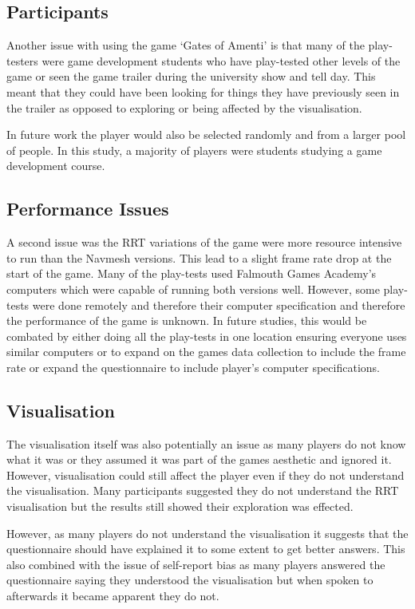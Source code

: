 \documentclass[journal]{IEEEtran}
\begin{document}
	\subsection{Participants}
	Another issue with using the game `Gates of Amenti' is that many of the play-testers were game development students who have play-tested other levels of the game or seen the game trailer during the university show and tell day. This meant that they could have been looking for things they have previously seen in the trailer as opposed to exploring or being affected by the visualisation.
	
	In future work the player would also be selected randomly and from a larger pool of people. In this study, a majority of players were students studying a game development course.
	
	\subsection{Performance Issues}
	A second issue was the RRT variations of the game were more resource intensive to run than the Navmesh versions. This lead to a slight frame rate drop at the start of the game. 
	Many of the play-tests used Falmouth Games Academy's computers which were capable of running both versions well. However, some play-tests were done remotely and therefore their computer specification and therefore the performance of the game is unknown. In future studies, this would be combated by either doing all the play-tests in one location ensuring everyone uses similar computers or to expand on the games data collection to include the frame rate or expand the questionnaire to include player's computer specifications.     
	
	\subsection{Visualisation}    
	The visualisation itself was also potentially an issue as many players do not know what it was or they assumed it was part of the games aesthetic and ignored it. However, visualisation could still affect the player even if they do not understand the visualisation.  Many participants suggested they do not understand the RRT visualisation but the results still showed their exploration was effected. 
	
	However, as many players do not understand the visualisation it suggests that the questionnaire should have explained it to some extent to get better answers. This also combined with the issue of self-report bias as many players answered the questionnaire saying they understood the visualisation but when spoken to afterwards it became apparent they do not. 
	
\end{document}
